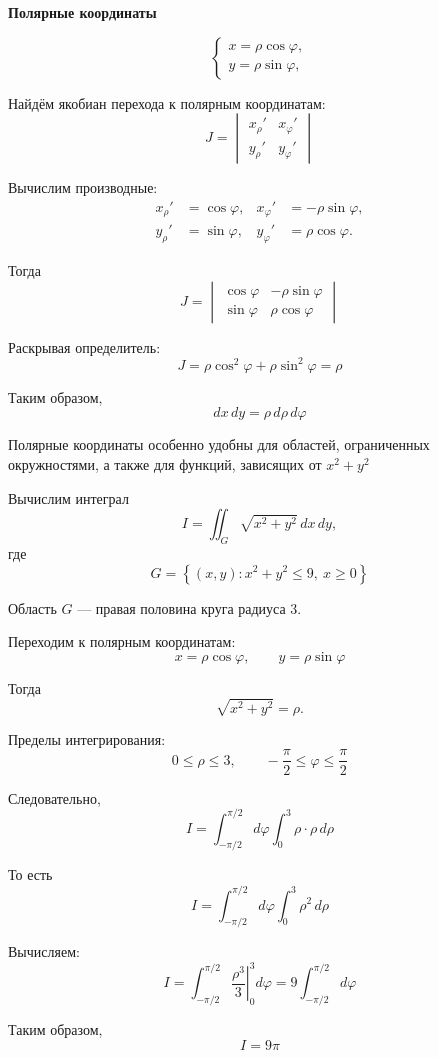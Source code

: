 \documentclass[12pt,a4paper]{article}
\begin{document}
\begin{example}

\textbf{Полярные координаты}

\[
\begin{cases}
x=\rho\cos\varphi,\\
y=\rho\sin\varphi,
\end{cases}
\]

Найдём якобиан перехода к полярным координатам:
\[
J=
\begin{vmatrix}
x_\rho'&x_\varphi'\\
y_\rho'&y_\varphi'
\end{vmatrix}
\]

Вычислим производные:
\[
\begin{aligned}
x_\rho'&=\cos\varphi,
&
x_\varphi'&=-\rho\sin\varphi,\\
y_\rho'&=\sin\varphi,
&
y_\varphi'&=\rho\cos\varphi.
\end{aligned}
\]

Тогда
\[
J=
\begin{vmatrix}
\cos\varphi&-\rho\sin\varphi\\
\sin\varphi&\rho\cos\varphi
\end{vmatrix}
\]

Раскрывая определитель:
\[
J=\rho\cos^2\varphi+\rho\sin^2\varphi=\rho
\]

Таким образом,
\[
dx\,dy=\rho\,d\rho\,d\varphi
\]

\begin{note}
Полярные координаты особенно удобны для областей, ограниченных окружностями, а также для функций, зависящих от $x^2+y^2$
\end{note}

Вычислим интеграл
\[
I=\iint_G\sqrt{x^2+y^2}\,dx\,dy,
\]
где
\[
G=\left\{(x,y):
x^2+y^2\leq9,\ x\geq0\right\}
\]

Область $G$ — правая половина круга радиуса $3$.

Переходим к полярным координатам:
\[
x=\rho\cos\varphi,\qquad
y=\rho\sin\varphi
\]

Тогда
\[
\sqrt{x^2+y^2}=\rho.
\]

Пределы интегрирования:
\[
0\leq\rho\leq3,\qquad
-\frac{\pi}{2}\leq\varphi\leq\frac{\pi}{2}
\]

Следовательно,
\[
I=
\int_{-\pi/2}^{\pi/2}d\varphi
\int_0^3\rho\cdot\rho\,d\rho
\]

То есть
\[
I=
\int_{-\pi/2}^{\pi/2}d\varphi
\int_0^3\rho^2\,d\rho
\]

Вычисляем:
\[
I=
\int_{-\pi/2}^{\pi/2}
\left.\frac{\rho^3}{3}\right|_0^3d\varphi
=
9\int_{-\pi/2}^{\pi/2}d\varphi
\]

Таким образом,
\[
I=9\pi
\]

\end{example}
\end{document}
